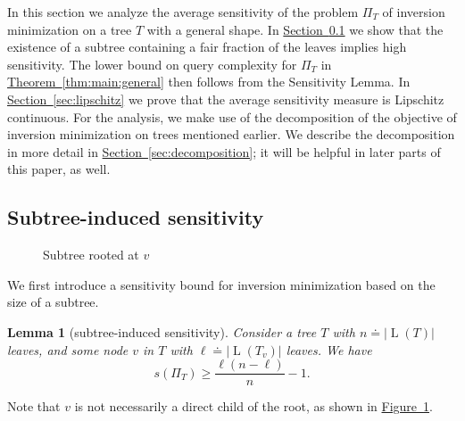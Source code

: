 \documentclass[11pt]{article}
\numberwithin{equation}{section}
\newtheorem{lemma}[theorem]{Lemma}
\theoremstyle{definition}
\theoremstyle{plain}
\newcommand{\expref}[2]{\hyperref[#2]{#1~\ref{#2}}}
\DeclareMathOperator{\leafset}{L}
\begin{document}
In this section we analyze the average sensitivity of the problem $\Pi_T$ of inversion minimization on a tree $T$ with a general shape. In \expref{Section}{sec:sensitivity:subtree} we show that the existence of a subtree containing a fair fraction of the leaves implies high sensitivity. The lower bound on query complexity for $\Pi_T$ in \expref{Theorem}{thm:main:general} then follows from the Sensitivity Lemma. In \expref{Section}{sec:lipschitz} we prove that the average sensitivity measure is Lipschitz continuous. For the analysis, we make use of the decomposition of the objective of inversion minimization on trees mentioned earlier. We describe the decomposition in more detail in \expref{Section}{sec:decomposition}; it will be helpful in later parts of this paper, as well. 

\subsection{Subtree-induced sensitivity}
\label{sec:sensitivity:subtree}

\begin{figure}
    \centering
    \caption{Subtree rooted at $v$}
    \label{fig:k-ary:subtree}
\end{figure}

We first introduce a sensitivity bound for inversion minimization based on the size of a subtree. 

\begin{lemma}[subtree-induced sensitivity]
    \label{lemma:k-ary:subtree-sensitivity}
    Consider a tree $T$ with $n \doteq \lvert\leafset(T)\rvert$ leaves, and some node $v$ in $T$ with $\ell \doteq \lvert\leafset(T_v)\rvert$ leaves. We have
    \[s(\Pi_T) \ge \frac{\ell(n-\ell)}{n}-1. \]
\end{lemma}
Note that $v$ is not necessarily a direct child of the root, as shown in \expref{Figure}{fig:k-ary:subtree}.
\end{document}
